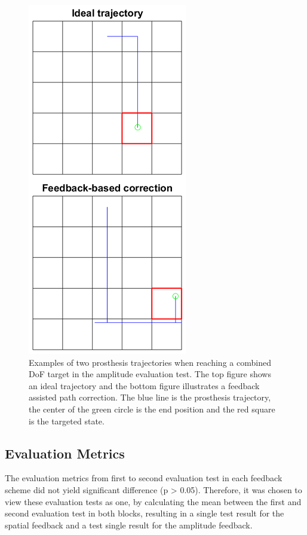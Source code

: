 \begin{figure}[h]                 
	\includegraphics[width=.7\textwidth]{figures/trajectories}
	\caption{Examples of two prosthesis trajectories when reaching a combined DoF target in the amplitude evaluation test. The top figure shows an ideal trajectory and the bottom figure illustrates a feedback assisted path correction. The blue line is the prosthesis trajectory, the center of the green circle is the end position and the red square is the targeted state.}
	\label{fig:pa:trajec} 
\end{figure}

\subsection{Evaluation Metrics}
The evaluation metrics from first to second evaluation test in each feedback scheme did not yield significant difference (p > 0.05). Therefore, it was chosen to view these evaluation tests as one, by calculating the mean between the first and second evaluation test in both blocks, resulting in a single test result for the spatial feedback and a test single result for the amplitude feedback. 

